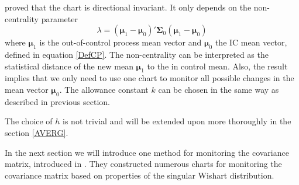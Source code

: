 \citet{Croiser1988} proved that the chart is directional invariant. It only depends on the non-centrality parameter
$$
\lambda = (\boldsymbol{\mu}_1-\boldsymbol{\mu}_0)'\boldsymbol{\Sigma}_0(\boldsymbol{\mu}_1-\boldsymbol{\mu}_0)
$$
where $\boldsymbol{\mu}_1$ is the out-of-control process mean vector and $\boldsymbol{\mu}_0$ the IC mean vector, defined in equation \eqref{DefCP}. The non-centrality can be interpreted as the statistical distance of the new mean $\boldsymbol{\mu}_1$ to the in control mean. Also, the result implies that we only need to use one chart to monitor all possible changes in the mean vector $\boldsymbol{\mu}_0$. The allowance constant $k$ can be chosen in the same way as described in previous section. 

The choice of $h$ is not trivial and will be extended upon more thoroughly in the section \ref{AVERG}. 

In the next section we will introduce one method for monitoring the covariance matrix, introduced in \citet{Bodnar2009}. They constructed numerous charts for monitoring the covariance matrix based on properties of the singular Wishart distribution.
